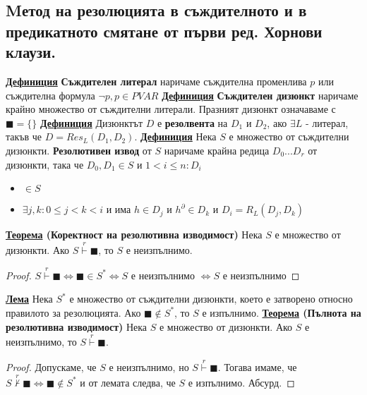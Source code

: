 \documentclass{article}
\begin{document}
\subsection*{Mетод на резолюцията в съждителното и в предикатното смятане от първи ред. Хорнови клаузи.}
\textbf{\underline{Дефиниция}}
\textbf{Съждителен литерал} наричаме съждителна променлива $p$ или съждителна формула $\neg p, p \in PVAR$ \newline\newline
\textbf{\underline{Дефиниция}}
\textbf{Съждителен дизюнкт} наричаме крайно множество от съждителни литерали. Празният дизюнкт означаваме с
$\blacksquare = \{\}$ \newline\newline
\textbf{\underline{Дефиниция}}
Дизюнктът $D$ е \textbf{резолвента} на $D_1$ и $D_2$, ако $\exists L$ - литерал, такъв че $D = Res_L(D_1, D_2)$. \newline\newline
\textbf{\underline{Дефиниция}}
Нека $S$ е множество от съждителни дизюнкти. \textbf{Резолютивен извод} от $S$ наричаме крайна редица $D_0...D_r$ от
дизюнкти, така че $D_0, D_1 \in S$ и $1 < i \le n : D_i$
\begin{itemize}
    \item $\in S$
    \item $\exists j, k: 0 \le j < k < i$ и има $h \in D_j$ и $h^{\partial} \in D_k$ и $D_i = R_L(D_j, D_k)$
\end{itemize}
\textbf{\underline{Теорема} (Коректност на резолютивна изводимост)} \newline
Нека $S$ е множество от дизюнкти. Ако $S \stackrel{r}{\vdash} \blacksquare$, то $S$ е неизпълнимо.
\begin{proof}
$S \stackrel{r}{\vdash} \blacksquare \iff \blacksquare \in S^* \iff S$ е неизпълнимо $\iff S$ е неизпълнимо
\end{proof}
\textbf{\underline{Лема}} \newline
Нека $S^*$ е множество от съждителни дизюнкти, което е затворено относно правилото за резолюцията. Ако $\blacksquare \notin S^*$,
то $S$ е изпълнимо. \newline\newline
\textbf{\underline{Теорема} (Пълнота на резолютивна изводимост)} \newline
Нека $S$ е множество от дизюнкти. Ако $S$ е неизпълнимо, то $S \stackrel{r}{\vdash} \blacksquare$.
\begin{proof}
Допускаме, че $S$ е неизпълнимо, но $S \stackrel{r}{\vdash} \blacksquare$. Тогава имаме, че $S \stackrel{r}
{\nvdash} \blacksquare \iff \blacksquare \notin S^*$ и от лемата следва, че $S$ е изпълнимо. Абсурд.
\end{proof}
\end{document}
